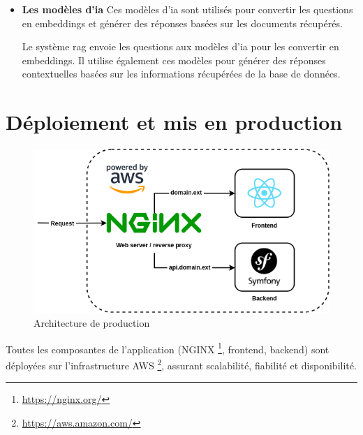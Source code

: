 \begin{itemize}
    Lorsqu'une requête nécessite une réponse contextuelle, Symfony appelle le système \ac{rag}. Ce système utilise les embeddings stockés dans PostgreSQL pour trouver les documents pertinents, puis génère une réponse en s'appuyant sur des modèles d'\ac{ia} (comme ceux de Mistral AI \footnote{\href{https://console.mistral.ai/}{https://console.mistral.ai/}} et OpenAI \footnote{\href{https://openai.com/}{https://openai.com/}}).

    \item \textbf{Les modèles d'\ac{ia}}
    Ces modèles d'\ac{ia} sont utilisés pour convertir les questions en embeddings et générer des réponses basées sur les documents récupérés.
    
    Le système \ac{rag} envoie les questions aux modèles d'\ac{ia} pour les convertir en embeddings. Il utilise également ces modèles pour générer des réponses contextuelles basées sur les informations récupérées de la base de données.
\end{itemize}

\section{Déploiement et mis en production}

\begin{figure}[H]
    \centering
    \includegraphics[width=15cm]{gfx/fig-deploy-architecture.png}
    \caption{Architecture de production}
    \label{fig:deploy-architecture}
\end{figure}

Toutes les composantes de l'application (NGINX \footnote{\href{https://nginx.org/}{https://nginx.org/}}, frontend, backend) sont déployées sur l'infrastructure AWS \footnote{\href{https://aws.amazon.com/}{https://aws.amazon.com/}}, assurant scalabilité, fiabilité et disponibilité.

